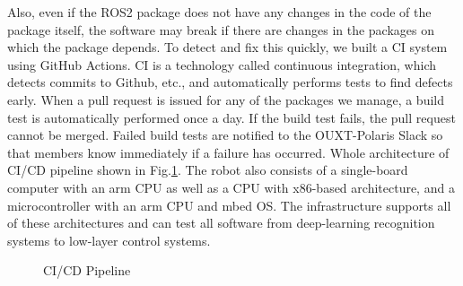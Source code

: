 \documentclass[lettersize,journal]{IEEEtran}
\begin{document}
Also, even if the ROS2 package does not have any changes in the code of the package itself,
the software may break if there are changes in the packages on which the package depends.
To detect and fix this quickly, we built a CI system using GitHub Actions.
CI is a technology called continuous integration, which detects commits to Github, etc.,
and automatically performs tests to find defects early.
When a pull request is issued for any of the packages we manage, a build test is automatically performed once a day.
If the build test fails, the pull request cannot be merged.
Failed build tests are notified to the OUXT-Polaris Slack so that members know immediately if a failure has occurred.
Whole architecture of CI/CD pipeline shown in Fig.\ref{fig:ci_cd_pipeline}.
The robot also consists of a single-board computer with an arm CPU as well as a CPU with x86-based architecture,
and a microcontroller with an arm CPU and mbed OS.
The infrastructure supports all of these architectures and 
can test all software from deep-learning recognition systems to low-layer control systems.

\begin{figure}[htbp]
    \begin{center}
  \end{center}
  \caption{CI/CD Pipeline}
  \label{fig:ci_cd_pipeline}
\end{figure}
\end{document}
